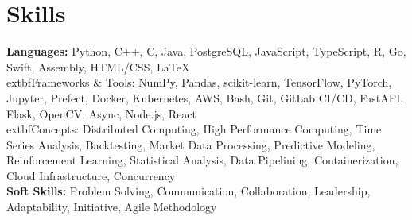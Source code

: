 \documentclass[letterpaper,10pt]{article}
\begin{document}
\section{Skills}
\begin{itemize}[leftmargin=0.15in, label={}]
\small{
  \item{
    \textbf{Languages:} Python, C++, C, Java, PostgreSQL, JavaScript, TypeScript, R, Go, Swift, Assembly, HTML/CSS, \LaTeX \\
  	extbf{Frameworks \& Tools:} NumPy, Pandas, scikit-learn, TensorFlow, PyTorch, Jupyter, Prefect, Docker, Kubernetes, AWS, Bash, Git, GitLab CI/CD, FastAPI, Flask, OpenCV, Async, Node.js, React \\
  	extbf{Concepts:} Distributed Computing, High Performance Computing, Time Series Analysis, Backtesting, Market Data Processing, Predictive Modeling, Reinforcement Learning, Statistical Analysis, Data Pipelining, Containerization, Cloud Infrastructure, Concurrency \\
    \textbf{Soft Skills:} Problem Solving, Communication, Collaboration, Leadership, Adaptability, Initiative, Agile Methodology
  }
}
\end{itemize}
\end{document}

